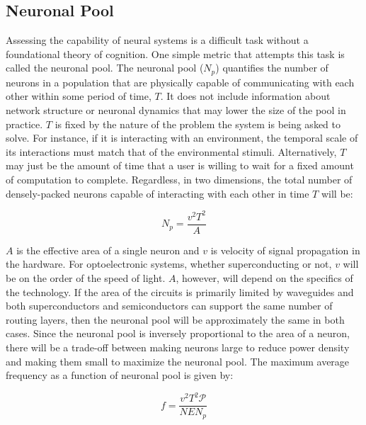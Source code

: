 \documentclass[twocolumn]{article}
\begin{document}
\subsection{Neuronal Pool}
Assessing the capability of neural systems is a difficult task without a foundational theory of cognition. One simple metric that attempts this task is called the neuronal pool. The neuronal pool ($N_p$) quantifies the number of neurons in a population that are physically capable of communicating with each other within some period of time, $T$. It does not include information about network structure or neuronal dynamics that may lower the size of the pool in practice. $T$ is fixed by the nature of the problem the system is being asked to solve. For instance, if it is interacting with an environment, the temporal scale of its interactions must match that of the environmental stimuli. Alternatively, $T$ may just be the amount of time that a user is willing to wait for a fixed amount of computation to complete. Regardless, in two dimensions, the total number of densely-packed neurons capable of interacting with each other in time $T$ will be:

\begin{equation}
    N_p = \frac{v^2T^2}{A}
\end{equation}

$A$ is the effective area of a single neuron and $v$ is velocity of signal propagation in the hardware. For optoelectronic systems, whether superconducting or not, $v$ will be on the order of the speed of light. $A$, however, will depend on the specifics of the technology. If the area of the circuits is primarily limited by waveguides and both superconductors and semiconductors can support the same number of routing layers, then the neuronal pool will be approximately the same in both cases. Since the neuronal pool is inversely proportional to the area of a neuron, there will be a trade-off between making neurons large to reduce power density and making them small to maximize the neuronal pool. The maximum average frequency as a function of neuronal pool is given by:

\begin{equation}
    f = \frac{v^2T^2\mathcal{P}}{NEN_p}
\end{equation}
\end{document}
